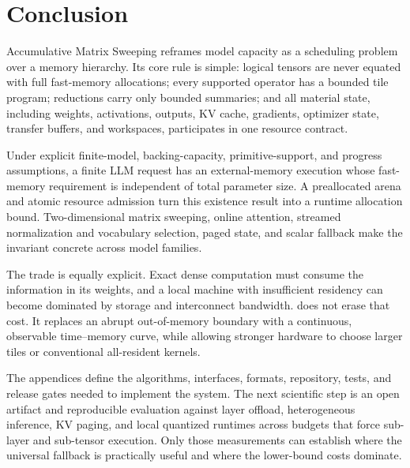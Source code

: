 \section{Conclusion}
\label{sec:conclusion}

Accumulative Matrix Sweeping reframes model capacity as a scheduling problem over a memory hierarchy. Its core rule is simple: logical tensors are never equated with full fast-memory allocations; every supported operator has a bounded tile program; reductions carry only bounded summaries; and all material state, including weights, activations, outputs, KV cache, gradients, optimizer state, transfer buffers, and workspaces, participates in one resource contract.

Under explicit finite-model, backing-capacity, primitive-support, and progress assumptions, a finite LLM request has an external-memory execution whose fast-memory requirement is independent of total parameter size. A preallocated arena and atomic resource admission turn this existence result into a runtime allocation bound. Two-dimensional matrix sweeping, online attention, streamed normalization and vocabulary selection, paged state, and scalar fallback make the invariant concrete across model families.

The trade is equally explicit. Exact dense computation must consume the information in its weights, and a local machine with insufficient residency can become dominated by storage and interconnect bandwidth. \AMS does not erase that cost. It replaces an abrupt out-of-memory boundary with a continuous, observable time--memory curve, while allowing stronger hardware to choose larger tiles or conventional all-resident kernels.

The appendices define the algorithms, interfaces, formats, repository, tests, and release gates needed to implement the system. The next scientific step is an open artifact and reproducible evaluation against layer offload, heterogeneous inference, KV paging, and local quantized runtimes across budgets that force sub-layer and sub-tensor execution. Only those measurements can establish where the universal fallback is practically useful and where the lower-bound costs dominate.
